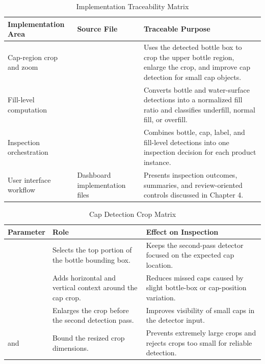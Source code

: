 \documentclass[12pt,a4paper]{report}
\begin{document}
\begin{table}[!ht]
\centering
\caption{Implementation Traceability Matrix}
\label{tab:implementation-traceability}
\begin{tabularx}{\textwidth}{|P{3.3cm}|P{4.5cm}|Y|}
\hline
\textbf{Implementation Area} & \textbf{Source File} & \textbf{Traceable Purpose} \\
\hline
Cap-region crop and zoom & \footnotesize{} & Uses the detected bottle box to crop the upper bottle region, enlarge the crop, and improve cap detection for small cap objects. \\
\hline
Fill-level computation & \footnotesize{} & Converts bottle and water-surface detections into a normalized fill ratio and classifies underfill, normal fill, or overfill. \\
\hline
Inspection orchestration & \footnotesize{} & Combines bottle, cap, label, and fill-level detections into one inspection decision for each product instance. \\
\hline
User interface workflow & Dashboard implementation files & Presents inspection outcomes, summaries, and review-oriented controls discussed in Chapter 4. \\
\hline
\end{tabularx}
\end{table}

\begin{table}[!ht]
\centering
\caption{Cap Detection Crop Matrix}
\label{tab:cap-crop-matrix}
\begin{tabularx}{\textwidth}{|P{3.2cm}|P{3.2cm}|Y|}
\hline
\textbf{Parameter} & \textbf{Role} & \textbf{Effect on Inspection} \\
\hline
\footnotesize{} & Selects the top portion of the bottle bounding box. & Keeps the second-pass detector focused on the expected cap location. \\
\hline
\footnotesize{} & Adds horizontal and vertical context around the cap crop. & Reduces missed caps caused by slight bottle-box or cap-position variation. \\
\hline
\footnotesize{} & Enlarges the crop before the second detection pass. & Improves visibility of small caps in the detector input. \\
\hline
\footnotesize{} and  & Bound the resized crop dimensions. & Prevents extremely large crops and rejects crops too small for reliable detection. \\
\hline
\end{tabularx}
\end{table}
\end{document}
